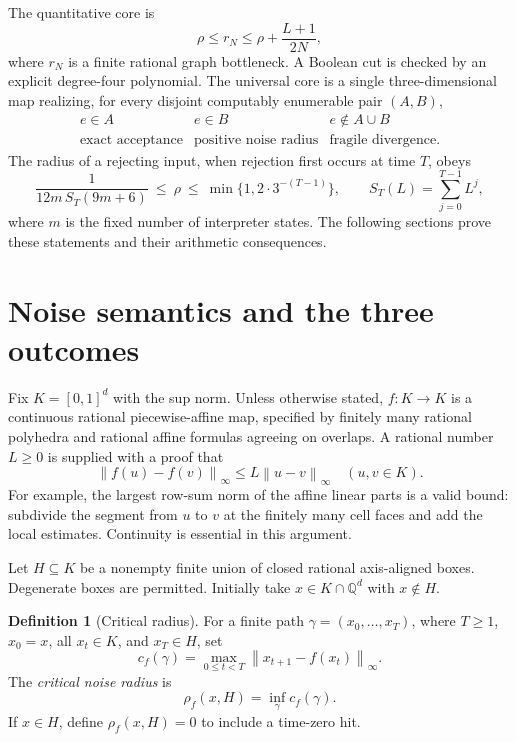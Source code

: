 \documentclass[11pt,letterpaper]{article}
\numberwithin{equation}{section}
\theoremstyle{definition}
\newtheorem{definition}[theorem]{Definition}
\theoremstyle{remark}
\newcommand{\Q}{\mathbb Q}
\newcommand{\norm}[1]{\left\lVert #1\right\rVert_{\infty}}
\newcommand{\cenum}{computably enumerable}
\newcommand{\PWA}{piecewise-affine}
\begin{document}
The quantitative core is
\begin{equation}
 \rho\le r_N\le\rho+\frac{L+1}{2N},
 \label{pqc:cb:eq:intro-grid}
\end{equation}
where $r_N$ is a finite rational graph bottleneck.  A Boolean cut is checked by
an explicit degree-four polynomial.  The universal core is a single
three-dimensional map realizing, for every disjoint \cenum{} pair $(A,B)$,
\[
 \begin{array}{c|c|c}
 e\in A & e\in B & e\notin A\cup B\\ \hline
 \text{exact acceptance} & \text{positive noise radius} &
 \text{fragile divergence}.
 \end{array}
\]
The radius of a rejecting input, when rejection first occurs at time $T$, obeys
\begin{equation}
 \frac{1}{12m\,S_T(9m+6)}
 \ \le\ \rho\ \le\ \min\{1,2\cdot3^{-(T-1)}\},
 \qquad S_T(L)=\sum_{j=0}^{T-1}L^j,
 \label{pqc:cb:eq:intro-time}
\end{equation}
where $m$ is the fixed number of interpreter states.  The following sections
prove these statements and their arithmetic consequences.

\section{Noise semantics and the three outcomes}
\label{pqc:cb:sec:semantics}

Fix $K=[0,1]^d$ with the sup norm.  Unless otherwise stated, $f:K\to K$ is a
continuous rational \PWA{} map, specified by finitely many rational polyhedra
and rational affine formulas agreeing on overlaps.  A rational number $L\ge0$
is supplied with a proof that
\begin{equation}
 \norm{f(u)-f(v)}\le L\norm{u-v}\quad(u,v\in K).
 \label{pqc:cb:eq:lip}
\end{equation}
For example, the largest row-sum norm of the affine linear parts is a valid
bound: subdivide the segment from $u$ to $v$ at the finitely many cell faces
and add the local estimates.  Continuity is essential in this argument.

Let $H\subseteq K$ be a nonempty finite union of closed rational axis-aligned
boxes.  Degenerate boxes are permitted.  Initially take $x\in K\cap\Q^d$ with
$x\notin H$.

\begin{definition}[Critical radius]
For a finite path $\gamma=(x_0,\ldots,x_T)$, where $T\ge1$, $x_0=x$, all
$x_t\in K$, and $x_T\in H$, set
\[
 c_f(\gamma)=\max_{0\le t<T}\norm{x_{t+1}-f(x_t)}.
\]
The \emph{critical noise radius} is
\begin{equation}
 \rho_f(x,H)=\inf_{\gamma} c_f(\gamma).
 \label{pqc:cb:eq:radius}
\end{equation}
If $x\in H$, define $\rho_f(x,H)=0$ to include a time-zero hit.
\end{definition}
\end{document}
